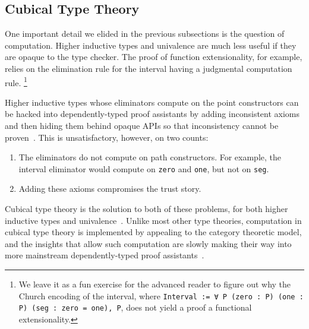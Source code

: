 
\subsection{Cubical Type Theory}\label{sec:fixes:theory:cubical}\label{sec:cubical}
One important detail we elided in the previous subsections is the question of computation.
Higher inductive types and univalence are much less useful if they are opaque to the type checker.
The proof of function extensionality, for example, relies on the elimination rule for the interval having a judgmental computation rule.%
\footnote{%
  We leave it as a fun exercise for the advanced reader to figure out why the Church encoding of the interval, where \texttt{Interval := ∀ P (zero : P) (one : P) (seg : zero = one), P}, does not yield a proof a functional extensionality.%
}

Higher inductive types whose eliminators compute on the point constructors can be hacked into dependently-typed proof assistants by adding inconsistent axioms and then hiding them behind opaque APIs so that inconsistency cannot be proven~\cite{Running2011Licata,Bertot2013}.
This is unsatisfactory, however, on two counts:
\begin{enumerate}
\item
  The eliminators do not compute on path constructors.
  For example, the interval eliminator would compute on \texttt{zero} and \texttt{one}, but not on \texttt{seg}.
\item
  Adding these axioms compromises the trust story.
\end{enumerate}

Cubical type theory is the solution to both of these problems, for both higher inductive types and univalence~\cite{Cubical2016Cohen}.
Unlike most other type theories, computation in cubical type theory is implemented by appealing to the category theoretic model, and the insights that allow such computation are slowly making their way into more mainstream dependently-typed proof assistants~\cite{Cubical2019Vezzosi}.

